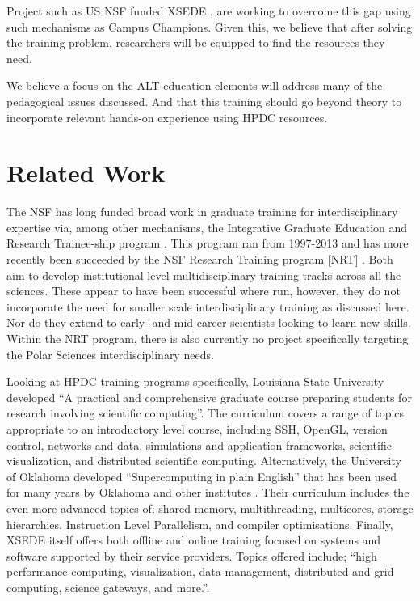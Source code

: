 \documentclass[conference]{IEEEtran}
\begin{document}
\begin{enumerate}[\setlength{\listparindent}{\parindent}]
Project such as US NSF funded XSEDE \cite{noauthor_undated-lh}, are working to overcome this gap using such mechanisms as Campus Champions.  Given this, we believe that after solving the training problem, researchers will be equipped to find the resources they need. \end{enumerate} We believe a focus on the ALT-education elements will address many of the pedagogical issues discussed.  And that this training should go beyond theory to incorporate relevant hands-on experience using HPDC resources.

\section{Related Work}
The NSF has long funded broad work in graduate training for interdisciplinary expertise via, among other mechanisms, the Integrative Graduate Education and Research Trainee-ship program \cite{noauthor_undated-bu}.  This program ran from 1997-2013 and has more recently been succeeded by the NSF Research Training program [NRT] \cite{NRT}.  Both aim to develop institutional level multidisciplinary training tracks across all the sciences. These appear to have been successful where run, however, they do not incorporate the need for smaller scale interdisciplinary training as discussed here.  Nor do they extend to early- and mid-career scientists looking to learn new skills. Within the NRT program, there is also currently no project specifically targeting the Polar Sciences interdisciplinary needs.

Looking at HPDC training programs specifically, Louisiana State University developed ``A practical and comprehensive graduate course preparing students for research involving scientific computing''\cite{Allen2011-qx}. The curriculum covers a range of topics appropriate to an introductory level course, including SSH, OpenGL, version control, networks and data, simulations and application frameworks, scientific visualization, and distributed scientific computing. Alternatively, the University of Oklahoma  developed ``Supercomputing in plain English'' \cite{Neeman2002-dk} that has been used for many years by Oklahoma and other institutes \cite{Neeman2008-mj}.  Their curriculum includes the even more advanced topics of; shared memory, multithreading, multicores, storage hierarchies, Instruction Level Parallelism, and compiler optimisations.  Finally, XSEDE itself offers both offline and online training focused on systems and software supported by their service providers. Topics offered include; ``high performance computing, visualization, data management, distributed and grid computing, science gateways, and more.''\cite{noauthor_undated-ht}.  
\end{document}
